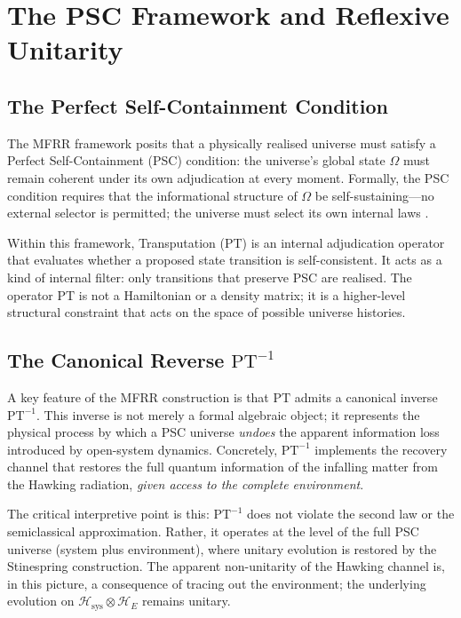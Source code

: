 \documentclass[11pt,twocolumn]{article}
\theoremstyle{remark}
\begin{document}
\section{The PSC Framework and Reflexive Unitarity}
\label{sec:mfrr}

\subsection{The Perfect Self-Containment Condition}

The MFRR framework \cite{SpivackNEMSMFRRBridge} posits that a
physically realised universe must satisfy a Perfect Self-Containment
(PSC) condition: the universe's global state $\Omega$ must remain
coherent under its own adjudication at every moment. Formally, the PSC
condition requires that the informational structure of $\Omega$ be
self-sustaining---no external selector is permitted; the universe must
select its own internal laws \cite{SpivackNEMSMFRRBridge}.

Within this framework, Transputation ($\mathrm{PT}$) is an internal adjudication
operator that evaluates whether a proposed state transition is
self-consistent. It acts as a kind of internal filter: only transitions
that preserve PSC are realised. The operator $\mathrm{PT}$ is not a
Hamiltonian or a density matrix; it is a higher-level structural
constraint that acts on the space of possible universe histories.

\subsection{The Canonical Reverse \texorpdfstring{$\mathrm{PT}^{-1}$}{PT-inverse}}

A key feature of the MFRR construction is that $\mathrm{PT}$ admits a
canonical inverse $\mathrm{PT}^{-1}$. This inverse is not merely a
formal algebraic object; it represents the physical process by which a
PSC universe \emph{undoes} the apparent information loss introduced by
open-system dynamics. Concretely, $\mathrm{PT}^{-1}$ implements the
recovery channel that restores the full quantum information of the
infalling matter from the Hawking radiation, \emph{given access to the
complete environment}.

The critical interpretive point is this: $\mathrm{PT}^{-1}$ does not
violate the second law or the semiclassical approximation. Rather, it
operates at the level of the full PSC universe (system plus
environment), where unitary evolution is restored by the Stinespring
construction. The apparent non-unitarity of the Hawking channel is, in
this picture, a consequence of tracing out the environment; the
underlying evolution on $\mathcal{H}_{\mathrm{sys}} \otimes
\mathcal{H}_E$ remains unitary.
\end{document}
